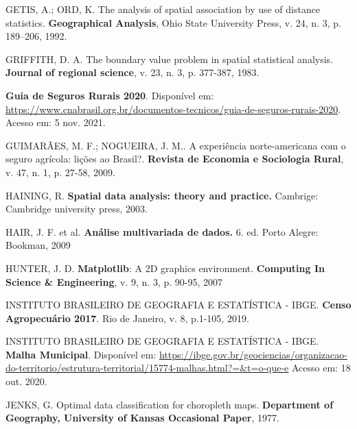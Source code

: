 \documentclass[
	12pt,				%
	openright,			%
	oneside,			%
	a4paper,			%
	chapter=TITLE,		%
	section=TITLE,		%
	english,			%
	french,				%
	spanish,			%
	brazil				%
	]{abntex2}
\begin{document}
\begin{thebibliography}{}
    {GETIS, A.; ORD, K. The analysis of spatial association by use of distance statistics. \textbf{Geographical Analysis}, Ohio State University Press, v. 24, n. 3, p. 189–206, 1992.}
    
    {GRIFFITH, D. A. The boundary value problem in spatial statistical analysis. \textbf{Journal of regional science}, v. 23, n. 3, p. 377-387, 1983.}
    
    {\textbf{Guia de Seguros Rurais 2020}. Disponível em: \url{https://www.cnabrasil.org.br/documentos-tecnicos/guia-de-seguros-rurais-2020}. Acesso em: 5 nov. 2021.}
    
    {GUIMARÃES, M. F.; NOGUEIRA, J. M.. A experiência norte-americana com o seguro agrícola: lições ao Brasil?. \textbf{Revista de Economia e Sociologia Rural}, v. 47, n. 1, p. 27-58, 2009.}
    
    {HAINING, R. \textbf{Spatial data analysis: theory and practice.} Cambrige: Cambridge university press, 2003.}
    
    {HAIR, J. F. et al. \textbf{Análise multivariada de dados.} 6. ed. Porto Alegre: Bookman, 2009}
    
    {HUNTER, J. D. \textbf{Matplotlib}: A 2D graphics environment. \textbf{Computing In Science \& Engineering}, v. 9, n. 3, p. 90-95, 2007}
    
    {INSTITUTO BRASILEIRO DE GEOGRAFIA E ESTATÍSTICA - IBGE. \textbf{Censo Agropecuário 2017}. Rio de Janeiro, v. 8, p.1-105, 2019.}
    
    {INSTITUTO BRASILEIRO DE GEOGRAFIA E ESTATÍSTICA - IBGE. \textbf{Malha Municipal}.  Disponível em: \url{https://ibge.gov.br/geociencias/organizacao-do-territorio/estrutura-territorial/15774-malhas.html?=&t=o-que-e} Acesso em: 18 out. 2020.}
    
    {JENKS, G. Optimal data classification for choropleth maps. \textbf{Department of Geography, University of Kansas Occasional Paper}, 1977.}
    

\end{thebibliography}
\end{document}

